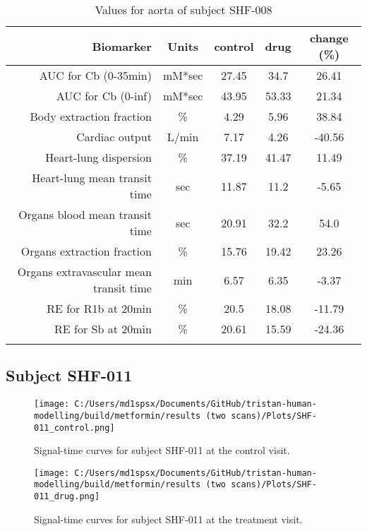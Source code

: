\documentclass{epflreport}%
\begin{document}
\begin{longtable}{rcccc}%
\hline%
Biomarker&Units&control&drug&change (\%)\\%
\hline%
AUC for Cb (0{-}35min)&mM*sec&27.45&34.7&26.41\\%
AUC for Cb (0{-}inf)&mM*sec&43.95&53.33&21.34\\%
Body extraction fraction&\%&4.29&5.96&38.84\\%
Cardiac output&L/min&7.17&4.26&{-}40.56\\%
Heart{-}lung dispersion&\%&37.19&41.47&11.49\\%
Heart{-}lung mean transit time&sec&11.87&11.2&{-}5.65\\%
Organs blood mean transit time&sec&20.91&32.2&54.0\\%
Organs extraction fraction&\%&15.76&19.42&23.26\\%
Organs extravascular mean transit time&min&6.57&6.35&{-}3.37\\%
RE for R1b at 20min&\%&20.5&18.08&{-}11.79\\%
RE for Sb at 20min&\%&20.61&15.59&{-}24.36\\%
\hline%
\caption{Values for aorta of subject SHF-008} \\%
\end{longtable}%
\clearpage%
\subsection{Subject SHF{-}011}%
\label{subsec:SubjectSHF{-}011}%

%


\begin{figure}[h!]%
\centering%
\texttt{[image: C:/Users/md1spsx/Documents/GitHub/tristan-human-modelling/build/metformin/results (two scans)/Plots/SHF-011\_control.png]}%
\caption{Signal{-}time curves for subject SHF{-}011 at the control visit.}%
\end{figure}

%


\begin{figure}[h!]%
\centering%
\texttt{[image: C:/Users/md1spsx/Documents/GitHub/tristan-human-modelling/build/metformin/results (two scans)/Plots/SHF-011\_drug.png]}%
\caption{Signal{-}time curves for subject SHF{-}011 at the treatment visit.}%
\end{figure}
\end{document}
